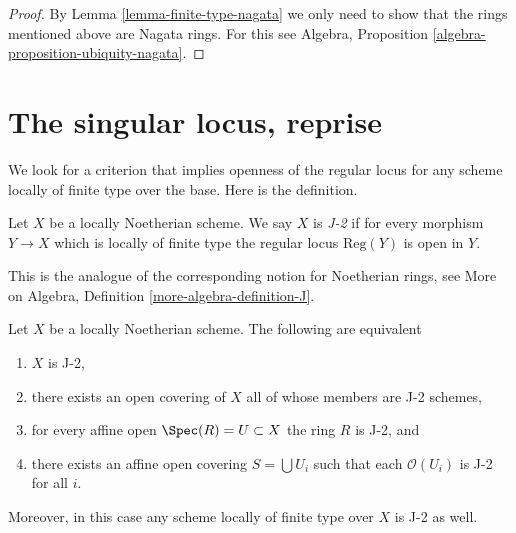 \begin{proof}
By Lemma \ref{lemma-finite-type-nagata} we only need to show that
the rings mentioned above are Nagata rings. For this see
Algebra, Proposition \ref{algebra-proposition-ubiquity-nagata}.
\end{proof}


\section{The singular locus, reprise}
\label{section-singular-locus}

\noindent
We look for a criterion that implies openness of the regular locus for
any scheme locally of finite type over the base. Here is the definition.

\begin{definition}
\label{definition-J}
Let $X$ be a locally Noetherian scheme. We say $X$ is {\it J-2}
if for every morphism $Y \to X$ which is locally of finite type
the regular locus $\text{Reg}(Y)$ is open in $Y$.
\end{definition}

\noindent
This is the analogue of the corresponding notion for Noetherian
rings, see More on Algebra, Definition \ref{more-algebra-definition-J}.

\begin{lemma}
\label{lemma-J}
Let $X$ be a locally Noetherian scheme. The following are equivalent
\begin{enumerate}
\item $X$ is J-2,
\item there exists an open covering of $X$ all of whose members are
J-2 schemes,
\item for every affine open $\Spec(R) = U \subset X$ the ring
$R$ is J-2, and
\item there exists an affine open covering $S = \bigcup U_i$ such
that each $\mathcal{O}(U_i)$ is J-2 for all $i$.
\end{enumerate}
Moreover, in this case any scheme locally of finite type over $X$
is J-2 as well.
\end{lemma}

